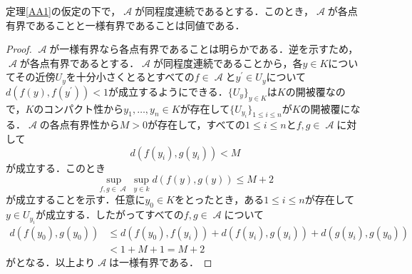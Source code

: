 \documentclass[uplatex]{jsarticle}
\begin{document}
\begin{lemma}\label{bdd}
    定理\ref{AA1}の仮定の下で，$\mscrA$が同程度連続であるとする．このとき，$\mscrA$が各点有界であることと一様有界であることは同値である．
\end{lemma}
\begin{proof}
    $\mscrA$が一様有界なら各点有界であることは明らかである．逆を示すため，$\mscrA$が各点有界であるとする．$\mscrA$が同程度連続であることから，各$y\in K$についてその近傍$U_y$を十分小さくとるとすべての$f\in \mscrA$と$y^\prime\in U_y$について$d(f(y),f(y^\prime)) < 1$が成立するようにできる．$\{U_y\}_{y\in K}$は$K$の開被覆なので，$K$のコンパクト性から$y_1,\dots , y_n\in K$が存在して$\{U_{y_i}\}_{1\leq i\leq n}$が$K$の開被覆になる．$\mscrA$の各点有界性から$M > 0$が存在して，すべての$1\leq i \leq n$と$f,g\in \mscrA$に対して
    \[ d(f(y_i),g(y_i)) < M \]
    が成立する．このとき
    \[ \sup_{f,g\in \mscrA} \sup_{y\in k} d(f(y),g(y)) \leq M+2 \]
    が成立することを示す．任意に$y_0\in K$をとったとき，ある$1\leq i\leq n$が存在して$y\in U_{y_i}$が成立する．したがってすべての$f,g\in \mscrA$について
    \begin{align*}
        d(f(y_0),g(y_0)) & \leq d(f(y_0),f(y_i)) + d(f(y_i),g(y_i)) + d(g(y_i),g(y_0)) \\
                         & < 1 + M + 1 = M+2
    \end{align*}
    がとなる．以上より$\mscrA$は一様有界である．
\end{proof}
\end{document}
